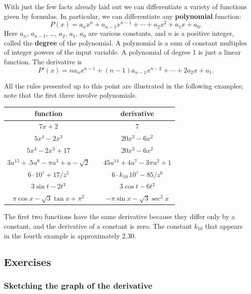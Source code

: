 With just the few facts already laid out we can differentiate a
variety of functions given by formulas.  In particular, we can
differentiate any {\bf polynomial} function:
\[
P(x) = a_nx^n + a_{n-1}x^{n-1} + \cdots + a_2x^2 + a_1x + a_0.
\]
Here $a_n$, $a_{n-1}$, \ldots, $a_2$, $a_1$, $a_0$ are various
constants, and $n$ is a positive integer, called the {\bf
  degree} of the polynomial.  A
polynomial is a sum of constant multiples of integer powers of the
input variable.  A polynomial of degree 1 is just a linear function.
The derivative is
\[
P'(x) = na_nx^{n-1} + (n-1)a_{n-1}x^{n-2} + \cdots + 2a_2x + a_1.
\]

All the rules presented up to this point are illustrated in the
following examples; note that the first three involve polynomials.
\begin{center}


\begin{tabular}{ccc}\label{deriv table}
	function & & derivative \\[2pt] \hline
	$7x + 2$ & \rule{0pt}{16pt} & $7$ \\ [2pt]
	$5x^4 - 2x^3$ &  & $20x^3 - 6x^2$ \\ [2pt]
	$5x^4 - 2x^3 + 17$ & & $20x^3 - 6x^2$ \\ [2pt]
	$3u^{15} + .5u^8 - \pi u^3 + u - \sqrt{2}$ & & 
		$45u^{14} + 4u^7 - 3 \pi u^2 + 1$ \\ [2pt]
	$6\cdot10^z + 17/z^5$ & & 
		$6\!\cdot\!k_{10}\,10^z - 85/z^6$ \\[2pt]
	$3\sin{t} -2t^3$ & & $3\cos{t} -6t^2$ \\ [2pt]
	$\pi \cos{x} - \sqrt{3} \tan{x} + \pi^2$ & & 
		$- \pi \sin{x} - \sqrt{3} \sec^2{x}$ 
\end{tabular}
\end{center}
The first two functions have the same derivative because they differ
only by a constant, and the derivative of a constant is zero.  The
constant $k_{10}$ that appears in the fourth example is approximately
2.30.




\subsection{Exercises}
\label{subsec:exercises}

\subsubsection{Sketching the graph of the derivative}
\label{subsubsec:sketching-the-graph-of-the-derivative}




